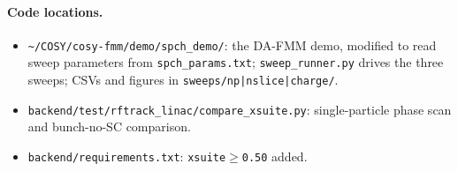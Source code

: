 \documentclass[11pt]{article}
\begin{document}
\paragraph{Code locations.}
\begin{itemize}
\item \texttt{\textasciitilde/COSY/cosy-fmm/demo/spch\_demo/}: the
      DA-FMM demo, modified to read sweep parameters from
      \texttt{spch\_params.txt}; \texttt{sweep\_runner.py} drives the
      three sweeps; CSVs and figures in \texttt{sweeps/np|nslice|charge/}.
\item \texttt{backend/test/rftrack\_linac/compare\_xsuite.py}:
      single-particle phase scan and bunch-no-SC comparison.
\item \texttt{backend/requirements.txt}: \texttt{xsuite$\geq$0.50}
      added.
\end{itemize}
\end{document}
